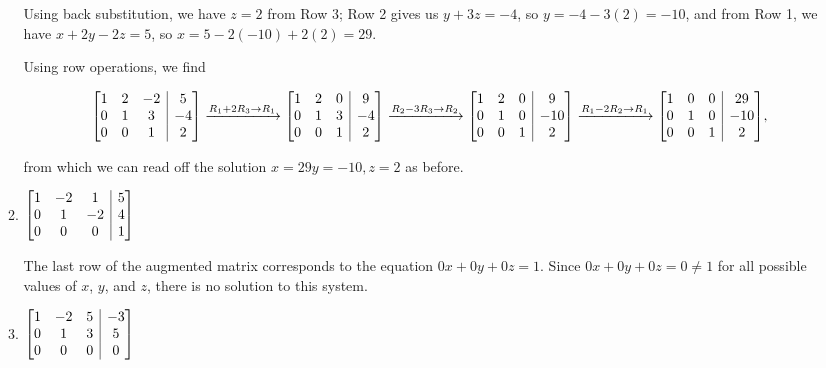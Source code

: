 \documentclass[12pt]{article}
\makeatletter
\newenvironment{amatrix}[1]{%
  \left[\begin{array}{@{}*{#1}{c}|c@{}}
}{%
  \end{array}\right]
}
\makeatother
\begin{document}
\begin{enumerate}
\begin{enumerate}
\bigskip

Using back substitution, we have $z=2$ from Row 3; Row 2 gives us $y+3z=-4$, so $y=-4-3(2)=-10$, and from Row 1, we have $x+2y-2z=5$, so $x=5-2(-10)+2(2) = 29$.

\medskip

Using row operations, we find

\hglue-48pt\begin{minipage}{\textwidth}
\[
 \begin{amatrix}{3}1&2&-2&5\\0&1&3&-4\\0&0&1&2\end{amatrix}\xrightarrow{\scriptsize{R_1+2R_3\to R_1}} \begin{amatrix}{3}1&2&0&9\\0&1&3&-4\\0&0&1&2\end{amatrix}
\xrightarrow{\scriptsize{R_2-3R_3\to R_2}}\begin{amatrix}{3}1&2&0&9\\0&1&0&-10\\0&0&1&2\end{amatrix}\xrightarrow{\scriptsize{R_1-2R_2\to R_1}}
\begin{amatrix}{3}1&0&0&29\\0&1&0&-10\\0&0&1&2\end{amatrix},                                                                        
\]
\end{minipage}

\medskip

from which we can read off the solution $x=29 y=-10, z=2$ as before.

\bigskip

 \item $\begin{amatrix}{3}1&-2&1&5\\0&1&-2&4\\0&0&0&1\end{amatrix}$ 

\bigskip

The last row of the augmented matrix corresponds to the equation $0x+0y+0z=1$. Since $0x+0y+0z=0\neq 1$ for all possible values of $x$, $y$, and $z$, there is no solution to this system.

\medskip

 \item $\begin{amatrix}{3}1&-2&5&-3\\0&1&3&5\\0&0&0&0\end{amatrix}$ 


\end{enumerate}
\end{enumerate}
\end{document}
